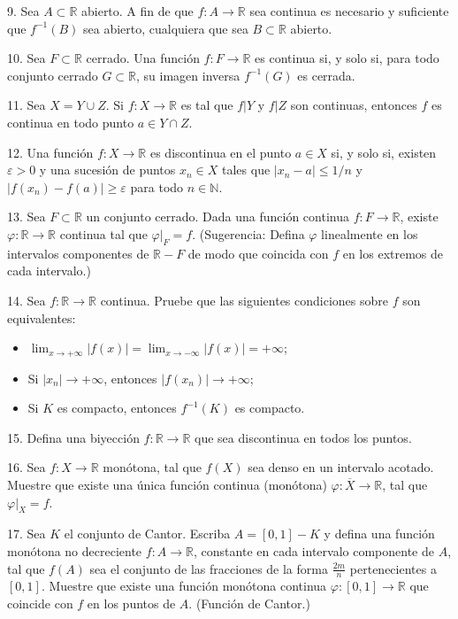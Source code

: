 \documentclass[12pt,oneside]{book}
\begin{document}
9. Sea \(A \subset \mathbb{R}\) abierto. A fin de que \(f: A \to \mathbb{R}\) sea continua es necesario y suficiente que \(f^{-1}(B)\) sea abierto, cualquiera que sea \(B \subset \mathbb{R}\) abierto.

10. Sea \(F \subset \mathbb{R}\) cerrado. Una función \(f: F \to \mathbb{R}\) es continua si, y solo si, para todo conjunto cerrado \(G \subset \mathbb{R}\), su imagen inversa \(f^{-1}(G)\) es cerrada.

11. Sea \(X = Y \cup Z\). Si \(f: X \to \mathbb{R}\) es tal que \(f|Y\) y \(f|Z\) son continuas, entonces \(f\) es continua en todo punto \(a \in Y \cap Z\).

12. Una función \(f: X \to \mathbb{R}\) es discontinua en el punto \(a \in X\) si, y solo si, existen \(\varepsilon > 0\) y una sucesión de puntos \(x_n \in X\) tales que \(|x_n - a| \leq 1/n\) y \(|f(x_n) - f(a)| \geq \varepsilon\) para todo \(n \in \mathbb{N}\).

13. Sea \(F \subset \mathbb{R}\) un conjunto cerrado. Dada una función continua \(f: F \to \mathbb{R}\), existe \(\varphi: \mathbb{R} \to \mathbb{R}\) continua tal que \(\varphi|_F = f\). (Sugerencia: Defina \(\varphi\) linealmente en los intervalos componentes de \(\mathbb{R} - F\) de modo que coincida con \(f\) en los extremos de cada intervalo.)

14. Sea \(f: \mathbb{R} \to \mathbb{R}\) continua. Pruebe que las siguientes condiciones sobre \(f\) son equivalentes:
\begin{itemize}
    \item[a)] \(\lim_{x \to +\infty} |f(x)| = \lim_{x \to -\infty} |f(x)| = +\infty\);
    \item[b)] Si \(|x_n| \to +\infty\), entonces \(|f(x_n)| \to +\infty\);
    \item[c)] Si \(K\) es compacto, entonces \(f^{-1}(K)\) es compacto.
\end{itemize}

15. Defina una biyección \(f: \mathbb{R} \to \mathbb{R}\) que sea discontinua en todos los puntos.

16. Sea \(f: X \to \mathbb{R}\) monótona, tal que \(f(X)\) sea denso en un intervalo acotado. Muestre que existe una única función continua (monótona) \(\varphi: \overline{X} \to \mathbb{R}\), tal que \(\varphi|_X = f\).

17. Sea \(K\) el conjunto de Cantor. Escriba \(A = [0, 1] - K\) y defina una función monótona no decreciente \(f: A \to \mathbb{R}\), constante en cada intervalo componente de \(A\), tal que \(f(A)\) sea el conjunto de las fracciones de la forma \(\frac{2m}{n}\) pertenecientes a \([0, 1]\). Muestre que existe una función monótona continua \(\varphi: [0, 1] \to \mathbb{R}\) que coincide con \(f\) en los puntos de \(A\). (Función de Cantor.)
\end{document}
